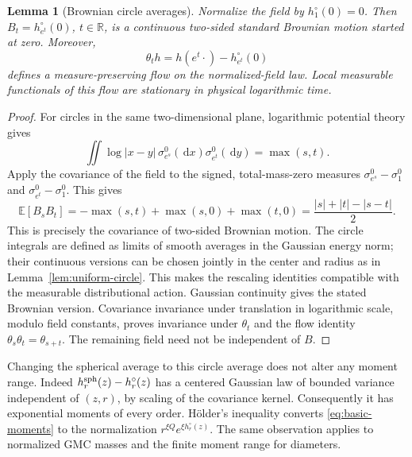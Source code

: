 \documentclass[11pt,reqno]{amsart}
\theoremstyle{plain}
\newtheorem{lemma}[theorem]{Lemma}
\theoremstyle{definition}
\theoremstyle{remark}
\newcommand{\R}{\mathbb R}
\newcommand{\E}{\mathbb E}
\newcommand{\1}{\mathbf{1}}
\newcommand{\dd}{\,\mathrm d}
\begin{document}
\begin{lemma}[Brownian circle averages]\label{lem:circle}
Normalize the field by $h_1^\circ(0)=0$. Then $B_t=h_{e^t}^\circ(0)$, $t\in\R$, is a continuous two-sided standard Brownian motion started at zero. Moreover,
\[
\theta_t h=h(e^t\cdot)-h_{e^t}^\circ(0)
\]
defines a measure-preserving flow on the normalized-field law. Local measurable functionals of this flow are stationary in physical logarithmic time.
\end{lemma}
\begin{proof}
For circles in the same two-dimensional plane, logarithmic potential theory gives
\[
\iint\log|x-y|\,\sigma^0_{e^s}(\dd x)\sigma^0_{e^t}(\dd y)=\max(s,t).
\]
Apply the covariance of the field to the signed, total-mass-zero measures $\sigma^0_{e^s}-\sigma^0_1$ and $\sigma^0_{e^t}-\sigma^0_1$. This gives
\[
\E[B_sB_t]=-\max(s,t)+\max(s,0)+\max(t,0)
=\frac{|s|+|t|-|s-t|}{2}.
\]
This is precisely the covariance of two-sided Brownian motion. The circle integrals are defined as limits of smooth averages in the Gaussian energy norm; their continuous versions can be chosen jointly in the center and radius as in Lemma~\ref{lem:uniform-circle}. This makes the rescaling identities compatible with the measurable distributional action. Gaussian continuity gives the stated Brownian version. Covariance invariance under translation in logarithmic scale, modulo field constants, proves invariance under $\theta_t$ and the flow identity $\theta_s\theta_t=\theta_{s+t}$. The remaining field need not be independent of $B$.
\end{proof}

Changing the spherical average to this circle average does not alter any moment range. Indeed $h_r^{\rm sph}(z)-h_r^\circ(z)$ has a centered Gaussian law of bounded variance independent of $(z,r)$, by scaling of the covariance kernel. Consequently it has exponential moments of every order. H\"older's inequality converts \eqref{eq:basic-moments} to the normalization $r^{\xi Q}e^{\xi h_r^\circ(z)}$. The same observation applies to normalized GMC masses and the finite moment range for diameters.
\end{document}
